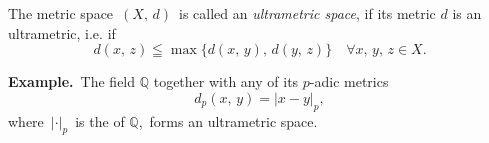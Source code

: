\documentclass[12pt]{article}
\begin{document}
The metric space \,$(X,\,d)$\, is called an {\em ultrametric space}, if its metric $d$ is an ultrametric, i.e. if
     $$d(x,\,z) \leqq \max \{d(x,\,y),\,d(y,\,z)\} \quad \forall x,\,y,\,z\in X.$$

\textbf{Example.} \,The field $\mathbb{Q}$ together with any of its $p$-adic metrics
                     $$d_p(x,\,y) = |x-y|_p,$$
where \,$|\cdot|_p$\, is the  of $\mathbb{Q}$,\, forms an ultrametric space.
\end{document}
